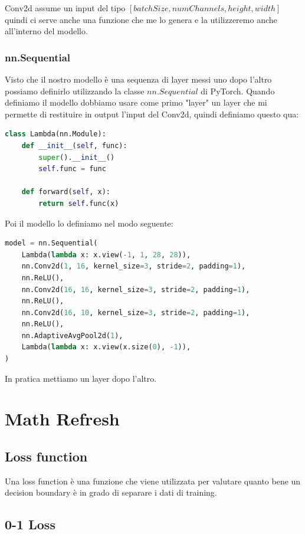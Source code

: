 \documentclass[14pt]{extreport}
\begin{document}
Conv2d assume un input del tipo $[batchSize, numChannels, height, width]$ quindi ci serve anche una funzione che me lo genera e la utilizzeremo anche
all'interno del modello.

\subsection{nn.Sequential}

Visto che il nostro modello è una sequenza di layer messi uno dopo l'altro possiamo definirlo utilizzando la classe $nn.Sequential$ di PyTorch. Quando
definiamo il modello dobbiamo usare come primo "layer" un layer che mi permette di restituire in output l'input del Conv2d, quindi definiamo questo
qua:

\begin{lstlisting}[language=Python]
class Lambda(nn.Module):
    def __init__(self, func):
        super().__init__()
        self.func = func

    def forward(self, x):
        return self.func(x)
\end{lstlisting}

Poi il modello lo definiamo nel modo seguente:

\begin{lstlisting}[language=Python]
model = nn.Sequential(
	Lambda(lambda x: x.view(-1, 1, 28, 28)),
	nn.Conv2d(1, 16, kernel_size=3, stride=2, padding=1),
	nn.ReLU(),
	nn.Conv2d(16, 16, kernel_size=3, stride=2, padding=1),
	nn.ReLU(),
	nn.Conv2d(16, 10, kernel_size=3, stride=2, padding=1),
	nn.ReLU(),
	nn.AdaptiveAvgPool2d(1),
	Lambda(lambda x: x.view(x.size(0), -1)),
)
\end{lstlisting}

In pratica mettiamo un layer dopo l'altro.




\chapter{Math Refresh}

\section{Loss function}

Una loss function è una funzione che viene utilizzata per valutare quanto bene un decision boundary è in grado di separare i dati di training.

\section{0-1 Loss}
\end{document}
